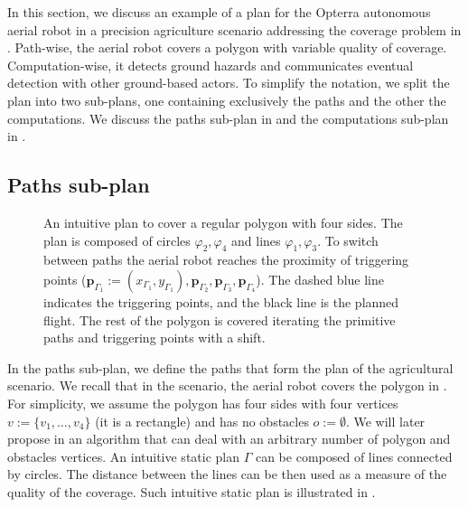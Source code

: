 In this section, we discuss an example of a plan for the Opterra autonomous aerial robot in a precision agriculture scenario addressing the coverage problem in . Path-wise, the aerial robot covers a polygon with variable quality of coverage. Computation-wise, it detects ground hazards and communicates eventual detection with other ground-based actors. To simplify the notation, we split the plan into two sub-plans, one containing exclusively the paths and the other the computations. We discuss the paths sub-plan in  and the computations sub-plan in .

\subsection{Paths sub-plan}
\label{sec:path-wise}

\begin{figure}[h]
  \centering
  
  \caption[Intuitive plan to cover a regular polygon with four sides]{An intuitive plan to cover a regular polygon with four sides. The plan is composed of circles $\varphi_2,\varphi_4$ and lines $\varphi_1,\varphi_3$. To switch between paths the aerial robot reaches the proximity of triggering points ($\mathbf{p}_{\Gamma_1}:=(x_{\Gamma_1},y_{\Gamma_1}),\mathbf{p}_{\Gamma_2},\mathbf{p}_{\Gamma_3},\mathbf{p}_{\Gamma_4}$). The dashed blue line indicates the triggering points, and the black line is the planned flight. The rest of the polygon is covered iterating the primitive paths and triggering points with a shift.}
  \label{fig:plot3}
\end{figure}

In the paths sub-plan, we define the paths that form the plan of the agricultural scenario. We recall that in the scenario, the aerial robot covers the polygon in . For simplicity, we assume the polygon has four sides with four vertices $v:=\{v_1,\dots,v_4\}$ (it is a rectangle) and has no obstacles $o:=\emptyset$. We will later propose in  an algorithm that can deal with an arbitrary number of polygon and obstacles vertices. An intuitive static plan $\Gamma$ can be composed of lines connected by circles. The distance between the lines can be then used as a measure of the quality of the coverage. Such intuitive static plan is illustrated in .

